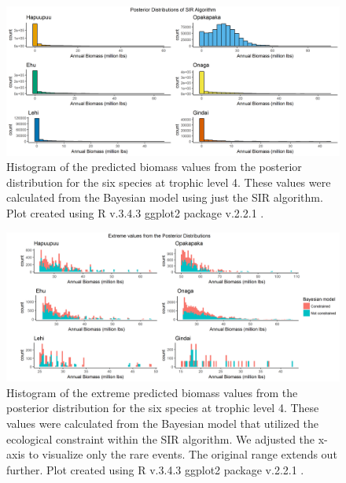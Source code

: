 \documentclass[oneside,12pt,final]{sty/ucthesis-CA2012}
\let\cite\citep                             %
\begin{document}
\begin{mainmatter}
\begin{figure}[H]
     \centering
       \includegraphics[width=\textwidth]{fig/post_sir}
    \caption{Histogram of the predicted biomass values from the posterior distribution for the six species at trophic level 4. These values were calculated from the Bayesian model using just the SIR algorithm. Plot created using R v.3.4.3 \cite{Rcite} ggplot2 package v.2.2.1 \cite{ggplot}.}
    \label{postsir}
\end{figure}

\begin{figure}[H]
     \centering
       \includegraphics[width=\textwidth]{fig/post_ext}
    \caption{Histogram of the extreme predicted biomass values from the posterior distribution for the six species at trophic level 4. These values were calculated from the Bayesian model that utilized the ecological constraint within the SIR algorithm. We adjusted the x-axis to visualize only the rare events. The original range extends out further. Plot created using R v.3.4.3 \cite{Rcite} ggplot2 package v.2.2.1 \cite{ggplot}.}
    \label{postext}
\end{figure}



\end{mainmatter}
\end{document}
